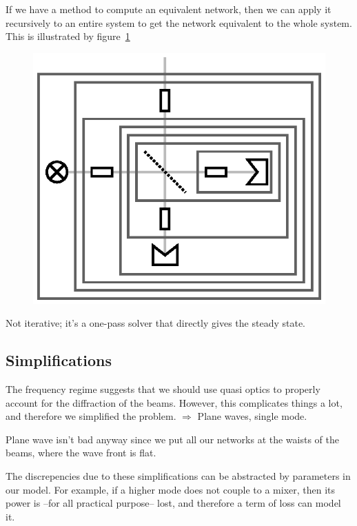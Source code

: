 \documentclass[a4paper,11pt]{article}
\begin{document}
If we have a method to compute an equivalent network, then we can apply it recursively to an entire system to get the network equivalent to the whole system.
This is illustrated by figure~\ref{fig:cascading_example}
\begin{figure}[hbtp]
    \centering
    \includegraphics{cascading_example}
    \caption{\label{fig:cascading_example}}
\end{figure}

Not iterative; it's a one-pass solver that directly gives the steady state.


\subsection{Simplifications}

The frequency regime suggests that we should use quasi optics to properly account for the diffraction of the beams.
However, this complicates things a lot, and therefore we simplified the problem.
$\Rightarrow$ Plane waves, single mode.

Plane wave isn't bad anyway since we put all our networks at the waists of the beams, where the wave front is flat.

The discrepencies due to these simplifications can be abstracted by parameters in our model.
For example, if a higher mode does not couple to a mixer, then its power is --for all practical purpose-- lost, and therefore a term of loss can model it.
\end{document}
